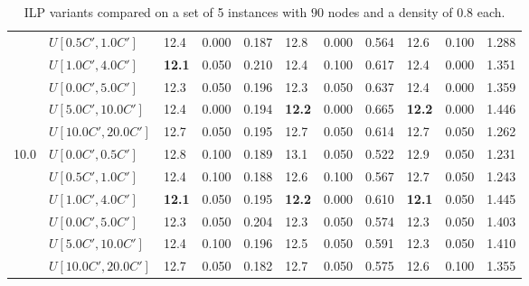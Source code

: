 \begin{table}[h]
{\begin{tabular}{|l|l||l|l|l||l|l|l||l|l|l|}
       & $U[0.5C',1.0C']$ & 12.4 & 0.000 & 0.187 & 12.8 & 0.000 & 0.564 & 12.6 & 0.100 & 1.288 \\
       & $U[1.0C',4.0C']$ & \textbf{12.1} & 0.050 & 0.210 & 12.4 & 0.100 & 0.617 & 12.4 & 0.000 & 1.351 \\
       & $U[0.0C',5.0C']$ & 12.3 & 0.050 & 0.196 & 12.3 & 0.050 & 0.637 & 12.4 & 0.000 & 1.359 \\
       & $U[5.0C',10.0C']$ & 12.4 & 0.000 & 0.194 & \textbf{12.2} & 0.000 & 0.665 & \textbf{12.2} & 0.000 & 1.446 \\
       & $U[10.0C',20.0C']$ & 12.7 & 0.050 & 0.195 & 12.7 & 0.050 & 0.614 & 12.7 & 0.050 & 1.262 \\
      \hline\hline
      \multirow{6}{*}{10.0} & $U[0.0C',0.5C']$ & 12.8 & 0.100 & 0.189 & 13.1 & 0.050 & 0.522 & 12.9 & 0.050 & 1.231 \\
       & $U[0.5C',1.0C']$ & 12.4 & 0.100 & 0.188 & 12.6 & 0.100 & 0.567 & 12.7 & 0.050 & 1.243 \\
       & $U[1.0C',4.0C']$ & \textbf{12.1} & 0.050 & 0.195 & \textbf{12.2} & 0.000 & 0.610 & \textbf{12.1} & 0.050 & 1.445 \\
       & $U[0.0C',5.0C']$ & 12.3 & 0.050 & 0.204 & 12.3 & 0.050 & 0.574 & 12.3 & 0.050 & 1.403 \\
       & $U[5.0C',10.0C']$ & 12.4 & 0.100 & 0.196 & 12.5 & 0.050 & 0.591 & 12.3 & 0.050 & 1.410 \\
       & $U[10.0C',20.0C']$ & 12.7 & 0.050 & 0.182 & 12.7 & 0.050 & 0.575 & 12.6 & 0.100 & 1.355 \\
      \hline
      \end{tabular}
      }
      \caption{ILP variants compared on a set of 5 instances with $90$ nodes and a density of $0.8$ each.}
      \label{tab:pcpn90p8RecoloredTT}
      \end{table}
      

